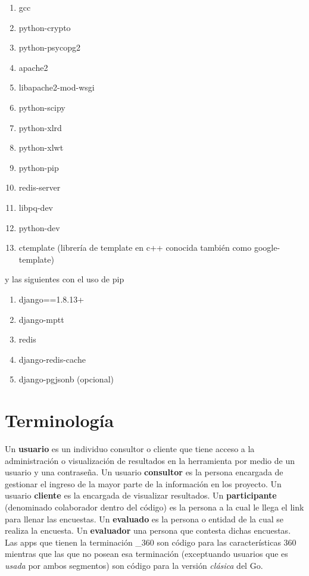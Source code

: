 \documentclass[10pt,a4paper]{book}
\begin{document}
	\begin{enumerate}
		\item gcc
		\item python-crypto
		\item python-psycopg2
		\item apache2 
		\item libapache2-mod-wsgi 
		\item python-scipy
		\item python-xlrd 
		\item python-xlwt 
		\item python-pip 
		\item redis-server 
		\item libpq-dev
		\item python-dev
		\item ctemplate (librería de template en c++ conocida también como google-template)
	\end{enumerate}
	
	y las siguientes con el uso de pip
	\begin{enumerate}
		\item django==1.8.13+ 
		\item django-mptt 
		\item redis 
		\item django-redis-cache
		\item django-pgjsonb (opcional)
	\end{enumerate}
	
	\section{Terminología}
	Un \textbf{usuario} es un individuo consultor o cliente que tiene acceso a la administración o visualización de resultados en la herramienta por medio de un usuario y una contraseña. Un usuario \textbf{consultor} es la persona encargada de gestionar el ingreso de la mayor parte de la información en los proyecto. Un usuario \textbf{cliente} es la encargada de visualizar resultados. Un \textbf{participante} (denominado colaborador dentro del código) es la persona a la cual le llega el link para llenar las encuestas. Un \textbf{evaluado} es la persona o entidad de la cual se realiza la encuesta. Un \textbf{evaluador} una persona que contesta dichas encuestas. Las apps que tienen la terminación \_360 son código para las características 360 mientras que las que no posean esa terminación (exceptuando usuarios que es \textit{usada} por ambos segmentos) son código para la versión \textit{clásica} del Go.
	
\end{document}
